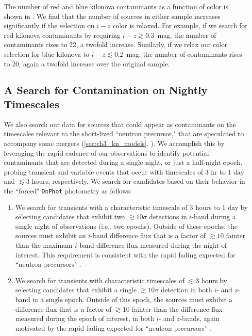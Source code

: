 The number of red and blue kilonova contaminants as a function of color is shown in . We find that the number of sources in either sample increases significantly if the selection on $i-z$ color is relaxed. For example, if we search for red kilonova contaminants by requiring $i-z \gtrsim 0.3$~mag, the number of contaminants rises to 22, a twofold increase. Similarly, if we relax our color selection for blue kilonova to $i-z \lesssim 0.2$~mag, the number of contaminants rises to 20, again a twofold increase over the original sample.

\subsection{A Search for Contamination on Nightly Timescales}
\label{sec:ch3_kn_short}
We also search our data for sources that could appear as contaminants on the timescales relevant to the short-lived ``neutron precursor," that are speculated to accompany some mergers (\cref{sec:ch3_kn_models}, \citealt{Metzger+15}). We accomplish this by leveraging the rapid cadence of our observations to identify potential contaminants that are detected during a single night, or just a half-night epoch, probing transient and variable events that occur with timescales of $3$ hr to 1 day and $\lesssim3$ hours, respectively. We search for candidates based on their behavior in the ``forced" {\tt DoPhot} photometry as follows:

\begin{enumerate}
\item We search for transients with a characteristic timescale of 3 hours to 1 day by selecting candidates that exhibit two $\gtrsim 10\sigma$ detections in $i$-band during a single night of observations (i.e., two epochs). Outside of these epochs, the sources must exhibit an $i$-band difference flux that is a factor of $\gtrsim 10$ fainter than the maximum $i$-band difference flux measured during the night of interest. This requirement is consistent with the rapid fading expected for ``neutron precursors" \citep{Metzger+15}.

\item We search for transients with characteristic timescales of $\lesssim 3$ hours by selecting candidates that exhibit a single $\gtrsim 10\sigma$ detection in both $i$- and $z$-band in a single epoch. Outside of this epoch, the sources must exhibit a difference flux that is a factor of $\gtrsim 10$ fainter than the difference flux measured during the epoch of interest, in both $i$- and $z$-bands, again motivated by the rapid fading expected for ``neutron precursors" \citep{Metzger+15}.
\end{enumerate}

